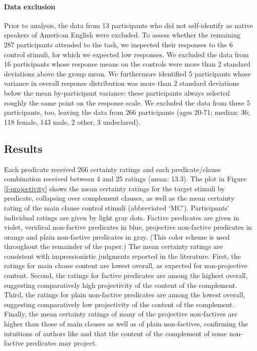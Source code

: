 \documentclass[11pt,fleqn]{article}
\newcommand{\6}{\mbox{$[\hspace*{-.6mm}[$}}
\newcommand{\9}{\mbox{$]\hspace*{-.6mm}]$}}
\begin{document}
\paragraph{Data exclusion}
Prior to analysis, the data from 13 participants who did not self-identify as native speakers of American English were excluded. To assess whether the remaining 287 participants attended to the task, we inspected their responses to the 6 control stimuli, for which we expected low responses. We excluded the data from 16 participants whose response means on the controls were more than 2 standard deviations above the group mean. We furthermore identified 5 participants whose variance in overall response distribution was more than 2 standard deviations below the mean by-participant variance: these participants always selected roughly the same point on the response scale. We excluded the data from these 5 participants, too, leaving the data from 266 participants (ages 20-71; median: 36; 118 female, 143 male, 2 other, 3 undeclared).

\subsection{Results}

Each predicate received 266 certainty ratings and each predicate/clause combination received between 4 and 25 ratings (mean: 13.3). The plot in Figure \ref{f-projectivity} shows the mean certainty ratings for the target stimuli by predicate, collapsing over complement clauses, as well as the mean certainty rating of the main clause control stimuli (abbreviated `MC'). Participants' individual ratings are given by light gray dots. Factive predicates are given in violet, veridical non-factive predicates in blue,  projective non-factive predicates in orange and plain non-factive predicates in gray. (This color scheme is used throughout the remainder of the paper.) The mean certainty ratings are consistent with impressionistic judgments reported in the literature. First, the ratings for main clause content are lowest overall, as expected for non-projective content. Second, the ratings for factive predicates are among the highest overall, suggesting comparatively high projectivity of the content of the complement. Third, the ratings for plain non-factive predicates are among the lowest overall, suggesting comparatively low projectivity of the content of the complement. Finally, the mean certainty ratings of many of the projective non-factives are higher than those of main clauses as well as of plain non-factives, confirming the intuitions of authors like \citet{schlenker10,anand-hacquard2014} and \citet{spector-egre2015} that the content of the complement of some non-factive predicates may project.
\end{document}
